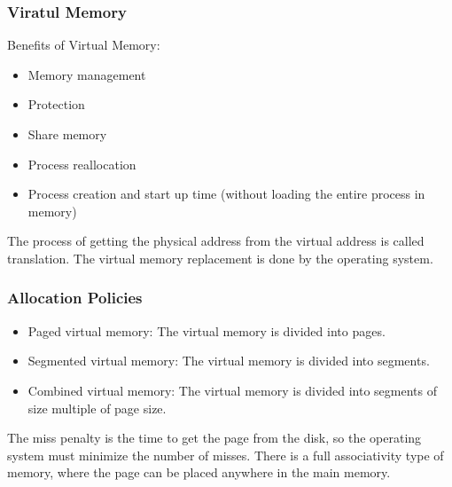 \begin{frame}
    \frametitle{Viratul Memory}
    Benefits of Virtual Memory:
    \begin{itemize}
        \item Memory management
        \item Protection
        \item Share memory
        \item Process reallocation
        \item Process creation and start up time (without loading the entire process in memory)
    \end{itemize}
    The process of getting the physical address from the virtual address is called translation.
    The virtual memory replacement is done by the operating system.
\end{frame}

\begin{frame}
    \frametitle{Allocation Policies}
    \begin{itemize}
        \item Paged virtual memory: The virtual memory is divided into pages.
        \item Segmented virtual memory: The virtual memory is divided into segments.
        \item Combined virtual memory: The virtual memory is divided into segments of size multiple of page size.
    \end{itemize}
    The miss penalty is the time to get the page from the disk, so the operating system must minimize the number of misses.
    There is a full associativity type of memory, where the page can be placed anywhere in the main memory.
\end{frame}


